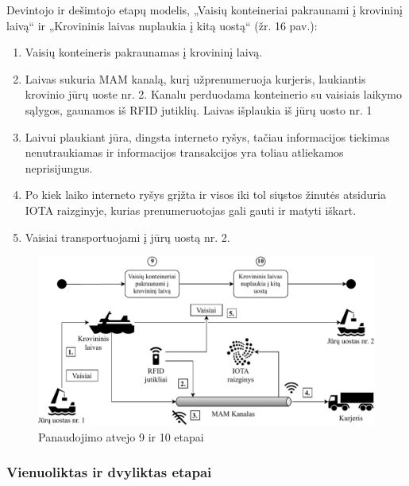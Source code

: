 Devintojo ir dešimtojo etapų modelis, „Vaisių konteineriai pakraunami į krovininį laivą“ ir „Krovininis laivas nuplaukia į kitą uostą“ (žr. 16 pav.):
\begin{enumerate}
    \item Vaisių konteineris pakraunamas į krovininį laivą.
    \item Laivas sukuria MAM kanalą, kurį užprenumeruoja kurjeris, laukiantis krovinio jūrų uoste nr. 2. Kanalu perduodama konteinerio su vaisiais laikymo sąlygos, gaunamos iš RFID jutiklių. Laivas išplaukia iš jūrų uosto nr. 1
    \item Laivui plaukiant jūra, dingsta interneto ryšys, tačiau informacijos tiekimas nenutraukiamas ir informacijos transakcijos yra toliau atliekamos neprisijungus. 
    \item Po kiek laiko interneto ryšys grįžta ir visos iki tol siųstos žinutės atsiduria IOTA raizginyje, kurias prenumeruotojas gali gauti ir matyti iškart.
    \item Vaisiai transportuojami į jūrų uostą nr. 2.
\end{enumerate}

\begin{figure}[H]
    \centering
    \includegraphics[scale=0.7]{images/iota-usecase-9-10}
    \caption{Panaudojimo atvejo 9 ir 10 etapai}
\end{figure}




\subsubsection{Vienuoliktas ir dvyliktas etapai}

